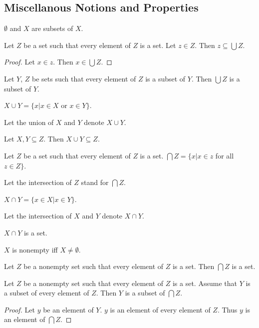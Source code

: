\documentclass[11pt]{article}
\begin{document}
\subsection{Miscellanous Notions and Properties}
\begin{forthel}

\begin{lemma} $\emptyset$ and $X$  are subsets of  $X$. \end{lemma}

\begin{lemma} Let $Z$ be a set such that every element of $Z$ is a set.
Let $z \in Z$. Then $z \subseteq \bigcup Z$.
\end{lemma}
\begin{proof}
Let $x \in z$. Then $x \in \bigcup Z$.
\end{proof}

\begin{lemma} Let $Y$, $Z$ be sets such that every element of $Z$ 
is a subset of $Y$. Then $\bigcup Z$ is a subset of $Y$.
\end{lemma}

\begin{definition}
$X \cup Y = \{x | x \in X$ or $x \in Y\}$. 
\end{definition}
Let the union of $X$ and $Y$ denote $X \cup Y$.

\begin{lemma}
Let $X,Y \subseteq Z$. Then $X \cup Y \subseteq Z$.
\end{lemma}

\begin{definition} Let $Z$ be a set such that every element of $Z$ is a set.
$\bigcap Z = \{x | x \in z$ for all $z \in Z\}$.
\end{definition}
Let the intersection of $Z$ stand for $\bigcap Z$. 

\begin{definition} $X \cap Y = \{x \in X | x \in Y\}$. \end{definition}
Let the intersection of $X$ and $Y$ denote $X \cap Y$. 

\begin{lemma} $X \cap Y$ is a set. \end{lemma}

\begin{definition} $X$ is nonempty iff $X \neq \emptyset$.
\end{definition}

\begin{lemma} Let $Z$ be a nonempty set such that every element of $Z$ is a set.
Then $\bigcap Z$ is a set.
\end{lemma}

\begin{lemma} Let $Z$ be a nonempty set such that every element of $Z$
is a set. Assume that $Y$ is a subset
of every element of $Z$. Then $Y$ is a subset of $\bigcap Z$.
\end{lemma}
\begin{proof}
Let $y$ be an element of $Y$.
$y$ is an element of every element of $Z$.
Thus $y$ is an element of $\bigcap Z$.
\end{proof}
\end{forthel}
\end{document}
